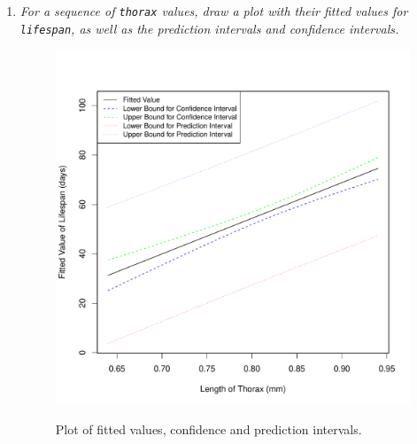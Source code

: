 \documentclass[12pt,letterpaper]{article}
\begin{document}
\begin{enumerate}[label=(\alph*)]
	\item\emph{	For a sequence of \texttt{thorax} values, draw a plot with their fitted values for \texttt{lifespan}, as well as the prediction intervals and confidence intervals.}
	  

\begin{figure}[h!]\centering
	\caption{\footnotesize Plot of fitted values, confidence and prediction intervals.
	}\vspace{-1cm}
	\label{fig:plot3_c}
	\includegraphics[width=.85\textwidth]{plot3_g.pdf}\\
\end{figure}
\end{enumerate}
\end{document}
